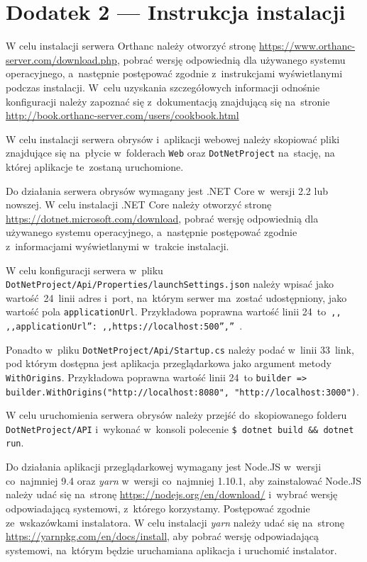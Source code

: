 \documentclass[a4paper,11pt,twoside,openright]{report}
\theoremstyle{definition}
\begin{document}
\chapter*{Dodatek 2 --- Instrukcja instalacji}

W celu instalacji serwera Orthanc należy otworzyć stronę
\url{https://www.orthanc-server.com/download.php}, pobrać wersję odpowiednią dla
używanego systemu operacyjnego, a~następnie postępować zgodnie z~instrukcjami
wyświetlanymi podczas instalacji. W~celu uzyskania szczegółowych informacji
odnośnie konfiguracji należy zapoznać się z~dokumentacją znajdującą się na~stronie
\url{http://book.orthanc-server.com/users/cookbook.html}

W celu instalacji serwera obrysów i~aplikacji webowej należy skopiować pliki
znajdujące się na~płycie w~folderach \texttt{Web} oraz \texttt{DotNetProject} na~stację,
na której aplikacje te~zostaną uruchomione.

Do działania serwera obrysów wymagany jest .NET Core w~wersji 2.2 lub nowszej.
W celu instalacji .NET Core należy otworzyć stronę \url{https://dotnet.microsoft.com/download},
pobrać wersję odpowiednią dla używanego systemu operacyjnego, a~następnie
postępować zgodnie z~informacjami wyświetlanymi w~trakcie instalacji.

W celu konfiguracji serwera w~pliku \texttt{DotNetProject/Api/Properties/launchSettings.json}
należy wpisać jako wartość~24~linii adres i~port, na~którym serwer ma~zostać
udostępniony, jako wartość pola \texttt{applicationUrl}. Przykładowa poprawna wartość
linii 24~to\texttt{ ,, ,,applicationUrl'': ,,https://localhost:500'','' }.

Ponadto w~pliku \texttt{DotNetProject/Api/Startup.cs} należy podać w~linii 33~link, pod
którym dostępna jest aplikacja przeglądarkowa jako argument metody \texttt{WithOrigins}.
Przykładowa poprawna wartość linii 24~to
\texttt{builder => builder.WithOrigins("http://localhost:8080", "http://localhost:3000")}.

W celu uruchomienia serwera obrysów należy przejść do~skopiowanego folderu
\texttt{DotNetProject/API} i~wykonać w~konsoli polecenie \texttt{\$ dotnet build \&\& dotnet run}.

Do działania aplikacji przeglądarkowej wymagany jest Node.JS w~wersji co~najmniej
9.4 oraz \textit{yarn} w~wersji co~najmniej 1.10.1, aby zainstalować Node.JS należy udać
się na~stronę \url{https://nodejs.org/en/download/} i~wybrać wersję odpowiadającą
systemowi, z~którego korzystamy. Postępować zgodnie ze~wskazówkami instalatora.
W celu instalacji \textit{yarn} należy udać się na~stronę \url{https://yarnpkg.com/en/docs/install},
aby pobrać wersję odpowiadającą systemowi, na~którym będzie uruchamiana aplikacja
i uruchomić instalator.
\end{document}
